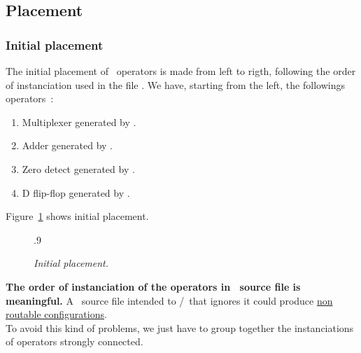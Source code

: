    \subsection{Placement}
     \subsubsection{Initial placement}
     \begin{minipage}[t]{\textwidth}
     \forceindent
         The initial placement of \datapath\ operators is made from left to
       rigth, following the order of instanciation used in the file
       \sampledptsource. We have, starting from the left, the
       followings operators~:
       \begin{enumerate}
         \item
            Multiplexer generated by \DPMUXIICS.
         \item
            Adder generated by \DPADDIIF.
         \item
            Zero detect generated by \DPNUL.
         \item
            D flip-flop generated by \DPPDFF.
       \end{enumerate}
       Figure~\ref{placesample} shows initial placement.
     \end{minipage}
     \vspace*{0.5cm}
     \begin{figure}[H]
       \begin{center}
         \leavevmode\epsfxsize.9\textwidth{}
       \end{center}
       \nopagebreak
       \caption{
         \label{placesample}
         {\it Initial placement.}}
     \end{figure}
     \indent
       {\bf The order of instanciation of the operators in \C\ source file
     is meaningful.} A \C\ source file intended to \fpgen/\dpr\ that
     ignores it could produce \underline{non routable configurations}.\\
     \forceindent
       To avoid this kind of problems, we just have to group together the
     instanciations of operators strongly connected.

